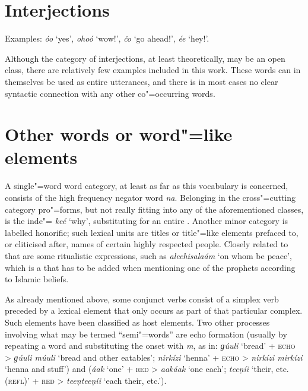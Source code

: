 \section{Interjections}
\label{sec:3b-14}
Examples: \textit{óo} `yes', \textit{ohoó} `wow!', \textit{čo} `go ahead!', \textit{ée} `hey!'.


Although the category of interjections, at least theoretically, may be an open class, there are relatively few examples included in this work. These words can in themselves be used as entire utterances, and there is in most cases no clear syntactic connection with any other co"=occurring words.


\section{Other words or word"=like elements}
\label{sec:3b-15}
A single"=word word category, at least as far as this vocabulary is concerned, consists of the high frequency negator word \textit{na}. Belonging in the cross"=cutting category pro"=forms, but not really fitting into any of the aforementioned classes, is the inde"= \textit{keé} `why', substituting for an entire . Another minor category is labelled honorific; such lexical units are titles or title"=like elements prefaced to, or cliticised after, names of certain highly respected people. Closely related to that are some ritualistic expressions, such as \textit{aleehisalaám} `on whom be peace', which is a  that has to be added when mentioning one of the prophets according to Islamic beliefs.


As already mentioned above, some conjunct verbs consist of a simplex verb preceded by a lexical element that only occurs as part of that particular complex. Such elements have been classified as host elements. Two other processes involving what may be termed ``semi"=words'' are echo formation (usually by repeating a word and substituting the onset with \textit{m}, as in: \textit{ɡúuli} `bread' + \textsc{echo} > \textit{ɡúuli múuli} `bread and other eatables'; \textit{nirkízi} `henna' + \textsc{echo} > \textit{nirkízi mirkízi} `henna and stuff') and  (\textit{áak} `one' + \textsc{red} > \textit{aakáak} `one each'; \textit{teeṇíi} `their, etc. (\textsc{refl})' + \textsc{red} > \textit{teeṇteeṇíi} `each their, etc.').

